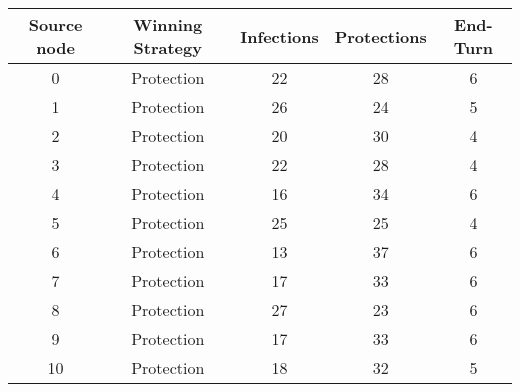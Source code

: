 \documentclass[results.tex]{subfiles}
\begin{document}
    \begin{center}
        \begin{tabular}{| c || c | c | c | c |}
            \hline
            {\bfseries Source node} & {\bfseries Winning Strategy} & {\bfseries Infections} & {\bfseries Protections}
            & {\bfseries End-Turn}
            \\  %
            \hline\hline
            0                       & Protection                   & 22                     & 28                      & 6                    \\
            \hline
            1                       & Protection                   & 26                     & 24                      & 5                    \\
            \hline
            2                       & Protection                   & 20                     & 30                      & 4                    \\
            \hline
            3                       & Protection                   & 22                     & 28                      & 4                    \\
            \hline
            4                       & Protection                   & 16                     & 34                      & 6                    \\
            \hline
            5                       & Protection                   & 25                     & 25                      & 4                    \\
            \hline
            6                       & Protection                   & 13                     & 37                      & 6                    \\
            \hline
            7                       & Protection                   & 17                     & 33                      & 6                    \\
            \hline
            8                       & Protection                   & 27                     & 23                      & 6                    \\
            \hline
            9                       & Protection                   & 17                     & 33                      & 6                    \\
            \hline
            10                      & Protection                   & 18                     & 32                      & 5                    \\

\end{tabular}
\end{center}
\end{document}
